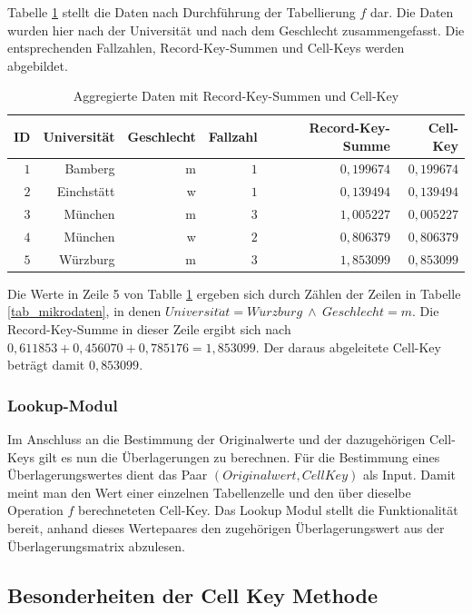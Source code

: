 Tabelle \ref{tab_agg} stellt die Daten nach Durchführung der Tabellierung $f$ dar. Die Daten wurden hier nach der Universität und nach dem Geschlecht zusammengefasst. Die entsprechenden Fallzahlen, Record-Key-Summen und Cell-Keys werden abgebildet. 

\begin{table}[h]
    \centering
    \begin{tabular}{ r r r r r r}
        \textbf{ID} \vline & \textbf{Universität} & \textbf{Geschlecht} & \textbf{Fallzahl} & \textbf{Record-Key-Summe} & \textbf{Cell-Key} \\ 
        \hline
        $1$ \vline & Bamberg & m & $1$ & $0,199674$ & $0,199674$ \\
        $2$ \vline & Einchstätt & w & $1$ & $0,139494$ & $0,139494$ \\
        $3$ \vline & München & m & $3$ & $1,005227$ & $0,005227$ \\
        $4$ \vline & München & w & $2$ & $0,806379$ & $0,806379$ \\
        $5$ \vline & Würzburg & m & $3$ & $1,853099$ & $0,853099$
    \end{tabular}
    \caption{Aggregierte Daten mit Record-Key-Summen und Cell-Key}
    \label{tab_agg}
\end{table}

Die Werte in Zeile 5 von Tablle \ref{tab_agg} ergeben sich durch Zählen der Zeilen in Tabelle \ref{tab_mikrodaten}, in denen $Universit\ddot{a}t = W\ddot{u}rzburg \: \wedge \: Geschlecht = m$. Die Record-Key-Summe in dieser Zeile ergibt sich nach $0,611853 + 0,456070 + 0,785176 = 1,853099$. Der daraus abgeleitete Cell-Key beträgt damit $0,853099$.

\subsubsection{Lookup-Modul}

Im Anschluss an die Bestimmung der Originalwerte und der dazugehörigen Cell-Keys gilt es nun die Überlagerungen zu berechnen. Für die Bestimmung eines Überlagerungswertes dient das Paar $(Originalwert, CellKey)$ als Input. Damit meint man den Wert einer einzelnen Tabellenzelle und den über dieselbe Operation $f$ berechneteten Cell-Key. Das Lookup Modul stellt die Funktionalität bereit, anhand dieses Wertepaares den zugehörigen Überlagerungswert aus der Überlagerungsmatrix abzulesen. 



\subsection{Besonderheiten der Cell Key Methode}%

